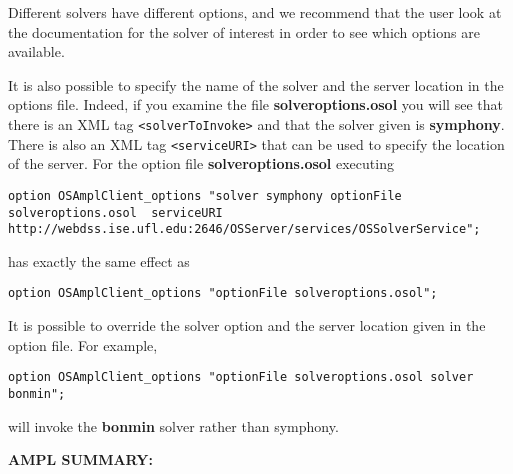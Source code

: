 \documentclass[11pt]{article}
\renewcommand{\{}{{\char"7B}}
\renewcommand{\}}{{\char"7D}}
\renewcommand{\^}{{\char"0D}}
\renewcommand{\'}{{\char"0D}}
\begin{document}



Different solvers have different options, and we recommend that the user look at the documentation for the solver of interest in order to see which options are available. 


It is also possible to specify the name of the solver and the server location in the options file. Indeed, if you examine the file {\bf solveroptions.osol} you will see that there is an XML tag {\tt <solverToInvoke>} and that the solver given is {\bf symphony}. There is also an XML tag {\tt <serviceURI>} that can be used to specify the location of the server.  For the option file {\bf solveroptions.osol} executing 


{\tiny
\begin{verbatim}
option OSAmplClient_options "solver symphony optionFile solveroptions.osol  serviceURI http://webdss.ise.ufl.edu:2646/OSServer/services/OSSolverService";
\end{verbatim}
}
\noindent has exactly the same effect as

\begin{verbatim}
option OSAmplClient_options "optionFile solveroptions.osol";
\end{verbatim}
It is possible to override the solver option and the server location given in the option file. For example, 
\begin{verbatim}
option OSAmplClient_options "optionFile solveroptions.osol solver bonmin";
\end{verbatim}
will invoke the {\bf bonmin} solver rather than symphony. 







\vskip 12pt

{\bf AMPL SUMMARY:}
\end{document}
